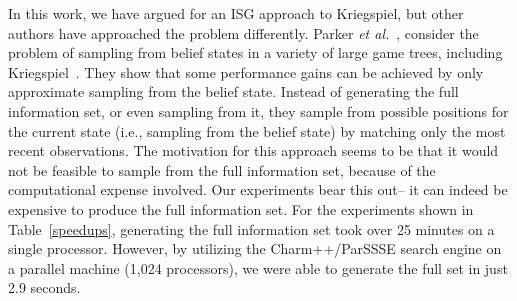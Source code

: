 \documentclass[times, 10pt,twocolumn]{article}
\newcommand{\etal}{{\em et al.}\ }
\begin{document}
In this work, we have argued for an ISG approach to Kriegspiel, but other
authors have approached the problem differently.  Parker \etal, consider the
problem of sampling from belief states in a variety of large game trees,
including Kriegspiel~\cite{parker05game}.  They show that some performance
gains can be achieved by only approximate sampling from the belief state.
Instead of generating the full information set, or even sampling from it, they
sample from possible positions for the current state (i.e., sampling from the
belief state) by matching only the most recent observations.  The motivation
for this approach seems to be that it would not be feasible to sample from the
full information set, because of the computational expense involved. Our
experiments bear this out-- it can indeed be expensive to produce the full
information set.  For the experiments shown in Table~\ref{speedups}, generating
the full information set took over 25 minutes on a single processor.  However,
by utilizing the {\sc Charm++/ParSSSE} search engine on a parallel machine (1,024
processors), we were able to generate the full set in just 2.9 seconds.    


\end{document}
